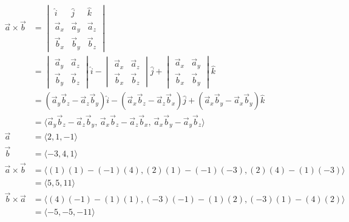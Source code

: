 \begin{align*}
    \vec{a} \times \vec{b} & = \begin{vmatrix}
        \hat{i} & \hat{j} & \hat{k} \\
        \vec{a}_x & \vec{a}_y & \vec{a}_z \\
        \vec{b}_x & \vec{b}_y & \vec{b}_z 
    \end{vmatrix} \\
    
    & = 
    \begin{vmatrix}
        \vec{a}_y & \vec{a}_z \\
        \vec{b}_y & \vec{b}_z
    \end{vmatrix} \hat{i} - 
    
    \begin{vmatrix}
        \vec{a}_x & \vec{a}_z \\
        \vec{b}_x & \vec{b}_z
    \end{vmatrix} \hat{j} +
    
    \begin{vmatrix}
        \vec{a}_x & \vec{a}_y \\
        \vec{b}_x & \vec{b}_y
    \end{vmatrix} \hat{k} \\
    
    & = 
    (\vec{a}_y\vec{b}_z - \vec{a}_z\vec{b}_y)\hat{i} -
    (\vec{a}_x\vec{b}_z - \vec{a}_z\vec{b}_x)\hat{j} +
    (\vec{a}_x\vec{b}_y - \vec{a}_x\vec{b}_y)\hat{k} \\
    
    & =
    \langle
        \vec{a}_y\vec{b}_z - \vec{a}_z\vec{b}_y\text{, } 
        \vec{a}_x\vec{b}_z - \vec{a}_z\vec{b}_x\text{, } 
        \vec{a}_x\vec{b}_y - \vec{a}_y\vec{b}_z
    \rangle \\
    
    \vec{a} & = \langle2, 1, -1\rangle \\
    \vec{b} & = \langle-3, 4, 1\rangle \\
    \vec{a} \times \vec{b} & = \langle
        (1)(1) - (-1)(4),
        (2)(1) - (-1)(-3),
        (2)(4) - (1)(-3)
    \rangle \\
    
    & = \langle
        5, 5, 11
    \rangle \\
    \vec{b} \times \vec{a} & = \langle
        (4)(-1) - (1)(1),
        (-3)(-1) - (1)(2),
        (-3)(1) - (4)(2)
    \rangle \\
    & = \langle
        -5, -5, -11
    \rangle
\end{align*}
